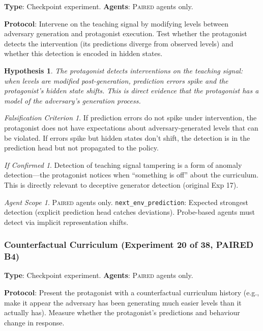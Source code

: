 \documentclass[11pt,a4paper]{article}
\newtheorem{hypothesis}{Hypothesis}[subsection]
\theoremstyle{remark}
\newtheorem*{falsification}{Falsification Criterion}
\newtheorem*{implication}{If Confirmed}
\newtheorem*{agentscope}{Agent Scope}
\newcommand{\paired}{\textsc{Paired}}
\begin{document}
\textbf{Type}: Checkpoint experiment. \textbf{Agents}: \paired{} agents only.

\textbf{Protocol}: Intervene on the teaching signal by modifying levels between adversary generation and protagonist execution. Test whether the protagonist detects the intervention (its predictions diverge from observed levels) and whether this detection is encoded in hidden states.

\begin{hypothesis}
The protagonist detects interventions on the teaching signal: when levels are modified post-generation, prediction errors spike and the protagonist's hidden state shifts. This is direct evidence that the protagonist has a model of the adversary's generation process.
\end{hypothesis}

\begin{falsification}
If prediction errors do not spike under intervention, the protagonist does not have expectations about adversary-generated levels that can be violated. If errors spike but hidden states don't shift, the detection is in the prediction head but not propagated to the policy.
\end{falsification}

\begin{implication}
Detection of teaching signal tampering is a form of anomaly detection---the protagonist notices when ``something is off'' about the curriculum. This is directly relevant to deceptive generator detection (original Exp 17).
\end{implication}

\begin{agentscope}
\paired{} agents only. \texttt{next\_env\_prediction}: Expected strongest detection (explicit prediction head catches deviations). Probe-based agents must detect via implicit representation shifts.
\end{agentscope}

\subsubsection{Counterfactual Curriculum (Experiment 20 of 38, PAIRED B4)}
\label{exp:counterfactual_curriculum}

\textbf{Type}: Checkpoint experiment. \textbf{Agents}: \paired{} agents only.

\textbf{Protocol}: Present the protagonist with a counterfactual curriculum history (e.g., make it appear the adversary has been generating much easier levels than it actually has). Measure whether the protagonist's predictions and behaviour change in response.
\end{document}
